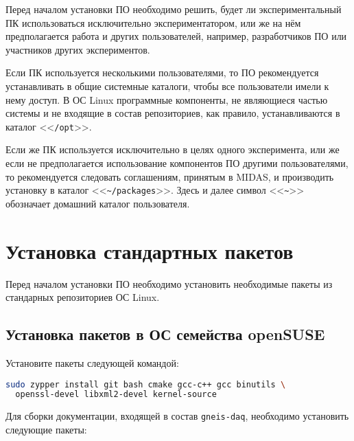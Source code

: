 \documentclass[12pt, a4paper, oneside, onecolumn]{book}
\newcommand{\GD}{{\tt gneis-daq}}
\newcommand{\MIDAS}{\mbox{MIDAS}}
\newcommand{\DIRECTORY}[1]{<<{\tt #1}>>}
\begin{document}
Перед началом установки ПО необходимо решить, будет ли экспериментальный ПК использоваться исключительно экспериментатором, или же на нём предполагается работа и других пользователей, например, разработчиков ПО или участников других экспериментов.

Если ПК используется несколькими пользователями, то ПО рекомендуется устанавливать в общие системные каталоги, чтобы все пользователи имели к нему доступ. В ОС Linux программные компоненты, не являющиеся частью системы и не входящие в состав репозиториев, как правило, устанавливаются в каталог \DIRECTORY{/opt}.

Если же ПК используется исключительно в целях одного эксперимента, или же если не предполагается использование компонентов ПО другими пользователями, то рекомендуется следовать соглашениям, принятым в \MIDAS{}, и производить установку в каталог \DIRECTORY{\~{}/packages}. Здесь и далее символ \DIRECTORY{\~{}} обозначает домашний каталог пользователя.

\section{Установка стандартных пакетов}

Перед началом установки ПО необходимо установить необходимые пакеты из стандарных репозиториев ОС Linux.

\subsection{Установка пакетов в ОС семейства openSUSE}

Установите пакеты следующей командой:

\begin{lstlisting}[language=bash]
sudo zypper install git bash cmake gcc-c++ gcc binutils \
  openssl-devel libxml2-devel kernel-source
\end{lstlisting}

Для сборки документации, входящей в состав \GD{}, необходимо установить следующие пакеты:
\end{document}
